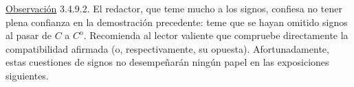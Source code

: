 \underline{Observación} 3.4.9.2. El redactor, que teme mucho a los signos,
confiesa no tener plena confianza en la demostración precedente: teme que
se hayan omitido signos al pasar de $C$ a $C^{\mathrm o}$. Recomienda al
lector valiente que compruebe directamente la compatibilidad afirmada (o,
respectivamente, su opuesta). Afortunadamente, estas cuestiones de signos
no desempeñarán ningún papel en las exposiciones siguientes.
